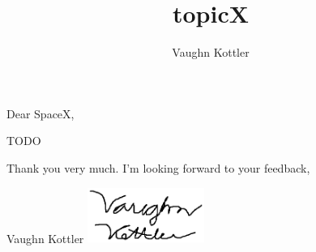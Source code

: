 \documentclass[letterpaper,11pt]{article}
\title{topicX}
\author{Vaughn Kottler}
\begin{document}
Dear SpaceX,

TODO

Thank you very much. I'm looking forward to your feedback,

Vaughn Kottler
\break
\includegraphics[width=1.5in,natwidth=315,natheight=148]{signature.png}
\end{document}
